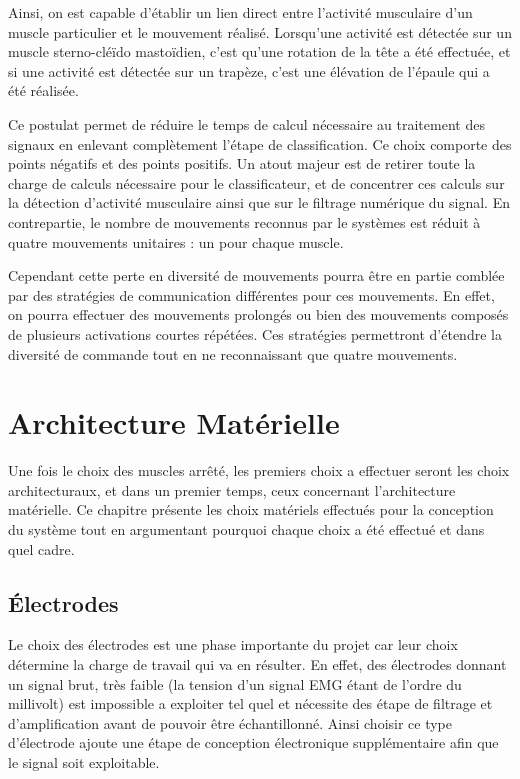 \documentclass[letterpaper, twoside, 12pt, memoire, creativecommons, hyperref]{thETS}
\begin{document}
Ainsi, on est capable d'établir un lien direct entre l'activité musculaire d'un muscle particulier et le mouvement réalisé. Lorsqu'une activité est détectée sur un muscle sterno-cléïdo mastoïdien, c'est qu'une rotation de la tête a été effectuée, et si une activité est détectée sur un trapèze, c'est une élévation de l'épaule qui a été réalisée.

Ce postulat permet de réduire le temps de calcul nécessaire au traitement des signaux en enlevant complètement l'étape de classification. Ce choix comporte des points négatifs et des points positifs. Un atout majeur est de retirer toute la charge de calculs nécessaire pour le classificateur, et de concentrer ces calculs sur la détection d'activité musculaire ainsi que sur le filtrage numérique du signal. En contrepartie, le nombre de mouvements reconnus par le systèmes est réduit à quatre mouvements unitaires : un pour chaque muscle. 

Cependant cette perte en diversité de mouvements pourra être en partie comblée par des stratégies de communication différentes pour ces mouvements. En effet, on pourra effectuer des mouvements prolongés ou bien des mouvements composés de plusieurs activations courtes répétées. Ces stratégies permettront d'étendre la diversité de commande tout en ne reconnaissant que quatre mouvements. 


\section{Architecture Matérielle}\label{CHarchimat}

Une fois le choix des muscles arrêté, les premiers choix a effectuer seront les choix architecturaux, et dans un premier temps, ceux concernant l'architecture matérielle. Ce chapitre présente les choix matériels effectués pour la conception du système tout en argumentant pourquoi chaque choix a été effectué et dans quel cadre.

\subsection{Électrodes}

Le choix des électrodes est une phase importante du projet car leur choix détermine la charge de travail qui va en résulter. En effet, des électrodes donnant un signal brut, très faible (la tension d'un signal EMG étant de l'ordre du millivolt) est impossible a exploiter tel quel et nécessite des étape de filtrage et d'amplification avant de pouvoir être échantillonné. Ainsi choisir ce type d'électrode ajoute une étape de conception électronique supplémentaire afin que le signal soit exploitable.
\end{document}
